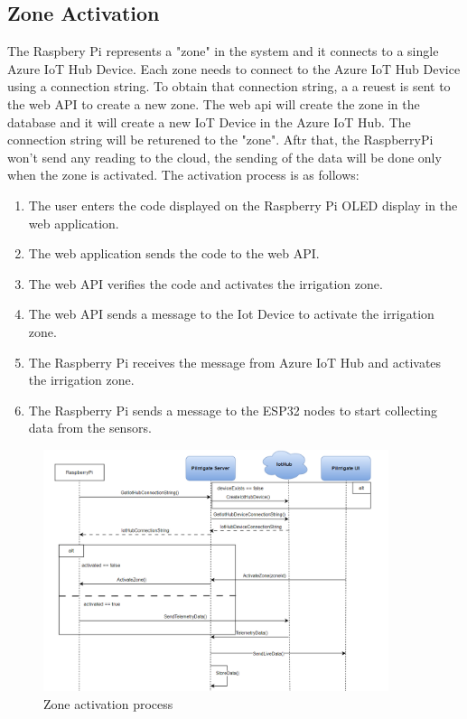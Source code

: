 \subsection{Zone Activation}
The Raspbery Pi represents a "zone" in the system and it connects to a single Azure IoT Hub Device. Each zone needs to
connect to the Azure IoT Hub Device using a connection string. To obtain that connection string, a a reuest is sent 
to the web API to create a new zone. The web api will create the zone in the database and it will create a new IoT Device
in the Azure IoT Hub. The connection string will be returened to the "zone". Aftr that, the RaspberryPi won't send any 
reading to the cloud, the sending of the data will be done only when the zone is activated.
The activation process is as follows:
\begin{enumerate}
    \item The user enters the code displayed on the Raspberry Pi OLED display in the web application.
    \item The web application sends the code to the web API.
    \item The web API verifies the code and activates the irrigation zone.
    \item The web API sends a message to the Iot Device to activate the irrigation zone.
    \item The Raspberry Pi receives the message from Azure IoT Hub and activates the irrigation zone.
    \item The Raspberry Pi sends a message to the ESP32 nodes to start collecting data from the sensors.
\end{enumerate}

\begin{figure}[H]
    \centering
    \includegraphics[width=0.9\textwidth]{images/activation.png}
    \caption{Zone activation process}
    \label{fig:zone-activation}
\end{figure}

